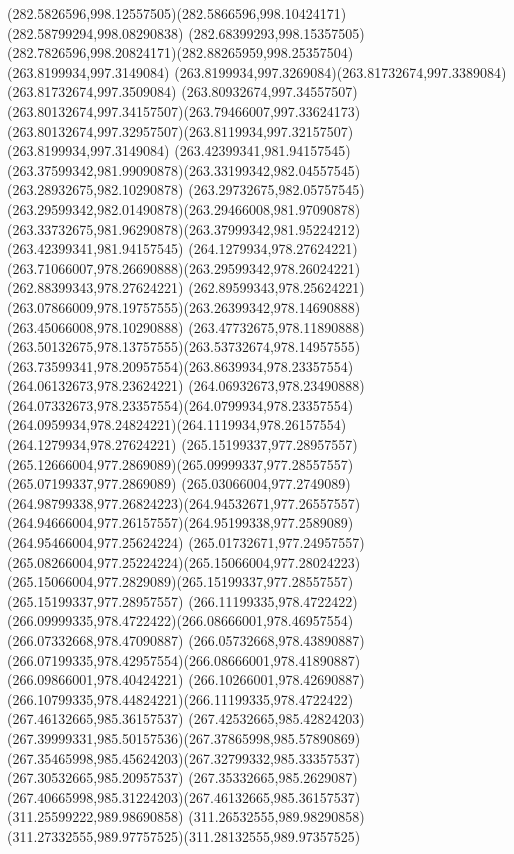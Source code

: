 {{\curveto(282.5826596,998.12557505)(282.5866596,998.10424171)(282.58799294,998.08290838)
\curveto(282.68399293,998.15357505)(282.7826596,998.20824171)(282.88265959,998.25357504)
\moveto(263.8199934,997.3149084)
\curveto(263.8199934,997.3269084)(263.81732674,997.3389084)(263.81732674,997.3509084)
\curveto(263.80932674,997.34557507)(263.80132674,997.34157507)(263.79466007,997.33624173)
\curveto(263.80132674,997.32957507)(263.8119934,997.32157507)(263.8199934,997.3149084)
\moveto(263.42399341,981.94157545)
\curveto(263.37599342,981.99090878)(263.33199342,982.04557545)(263.28932675,982.10290878)
\curveto(263.29732675,982.05757545)(263.29599342,982.01490878)(263.29466008,981.97090878)
\curveto(263.33732675,981.96290878)(263.37999342,981.95224212)(263.42399341,981.94157545)
\moveto(264.1279934,978.27624221)
\curveto(263.71066007,978.26690888)(263.29599342,978.26024221)(262.88399343,978.27624221)
\lineto(262.89599343,978.25624221)
\curveto(263.07866009,978.19757555)(263.26399342,978.14690888)(263.45066008,978.10290888)
\curveto(263.47732675,978.11890888)(263.50132675,978.13757555)(263.53732674,978.14957555)
\curveto(263.73599341,978.20957554)(263.8639934,978.23357554)(264.06132673,978.23624221)
\curveto(264.06932673,978.23490888)(264.07332673,978.23357554)(264.0799934,978.23357554)
\curveto(264.0959934,978.24824221)(264.1119934,978.26157554)(264.1279934,978.27624221)
\moveto(265.15199337,977.28957557)
\curveto(265.12666004,977.2869089)(265.09999337,977.28557557)(265.07199337,977.2869089)
\curveto(265.03066004,977.2749089)(264.98799338,977.26824223)(264.94532671,977.26557557)
\curveto(264.94666004,977.26157557)(264.95199338,977.2589089)(264.95466004,977.25624224)
\curveto(265.01732671,977.24957557)(265.08266004,977.25224224)(265.15066004,977.28024223)
\curveto(265.15066004,977.2829089)(265.15199337,977.28557557)(265.15199337,977.28957557)
\moveto(266.11199335,978.4722422)
\curveto(266.09999335,978.4722422)(266.08666001,978.46957554)(266.07332668,978.47090887)
\lineto(266.05732668,978.43890887)
\curveto(266.07199335,978.42957554)(266.08666001,978.41890887)(266.09866001,978.40424221)
\curveto(266.10266001,978.42690887)(266.10799335,978.44824221)(266.11199335,978.4722422)
\moveto(267.46132665,985.36157537)
\curveto(267.42532665,985.42824203)(267.39999331,985.50157536)(267.37865998,985.57890869)
\curveto(267.35465998,985.45624203)(267.32799332,985.33357537)(267.30532665,985.20957537)
\curveto(267.35332665,985.2629087)(267.40665998,985.31224203)(267.46132665,985.36157537)
\moveto(311.25599222,989.98690858)
\curveto(311.26532555,989.98290858)(311.27332555,989.97757525)(311.28132555,989.97357525)
}}
